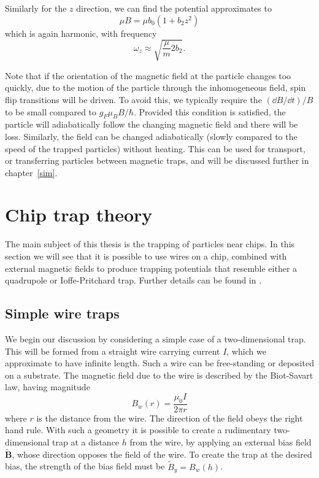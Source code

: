 Similarly for the $z$ direction, we can find the potential
approximates to
%
\begin{equation}
  \mu B = \mu b_0 (1 + b_2 z^2)
\end{equation}
%
which is again harmonic, with frequency
%
\begin{equation}
  \omega_z \approx \sqrt{\frac{\mu}{m}2b_2}.
\end{equation}

Note that if the orientation of the magnetic field at the particle changes too
quickly, due to the motion of the particle through the inhomogeneous field,
spin flip transitions will be driven. To avoid this, we typically require the
$(\dd B/\dd t)/B$ to be small compared to $g_F \mu_B B/\hbar$. Provided this
condition is satisfied, the particle will adiabatically follow the changing
magnetic field and there will be loss.
%
Similarly, the field can be changed adiabatically (slowly compared to the speed
of the trapped particles) without heating. This can be used for
transport, or transferring particles between magnetic traps, and will be
discussed further in chapter~\ref{sim}.

\section{Chip trap theory}
\label{theory:chips}

The main subject of this thesis is the trapping of particles near chips. In
this section we will see that it is possible to use wires on a chip, combined
with external magnetic fields to produce trapping potentials that resemble
either a quadrupole or Ioffe-Pritchard trap. Further details can be found in
.

\subsection{Simple wire traps}
\label{theory:simple}

We begin our discussion by considering a simple case of a two-dimensional trap.
This will be formed from a straight wire carrying current $I$, which we
approximate to have infinite length. Such a wire can be free-standing or
deposited on a substrate. The magnetic field due to the wire is described by
the Biot-Savart law, having magnitude
%
\begin{equation}
  B_w(r) = \frac{\mu_0 I}{2 \pi r}
  \label{theory:eqn:wire}
\end{equation}
%
where $r$ is the distance from the wire. The direction of the field obeys the
right hand rule. With such a geometry it is possible to create a rudimentary
two-dimensional trap at a distance $h$ from the wire, by applying an external
bias field $\mathbf{\tilde{B}}$, whose direction opposes the field of the wire.
To create the trap at the desired bias, the strength of the bias field must be
$\tilde{B}_y = B_w(h)$.

